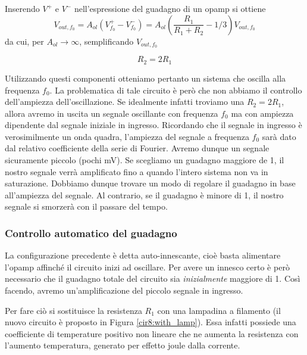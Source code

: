 Inserendo $V^+$ e $V^-$ nell'espressione del guadagno di un opamp si ottiene
\vspace{-2mm}
\begin{equation}
	V_{out,f_0} = A_{ol}\left( V^+_{f_0} - V^-_{f_0} \right) = A_{ol}\left(\frac{R_1}{R_1+R_2} - 1/3\right)V_{out,f_0}
\end{equation}
\vspace{-4mm}
da cui, per $A_{ol} \rightarrow \infty$, semplificando $V_{out,f_0}$

\begin{equation}
	R_2 = 2 R_1
\end{equation}

Utilizzando questi componenti otteniamo pertanto un sistema che oscilla alla frequenza $f_0$.
La problematica di tale circuito è però che non abbiamo il controllo dell'ampiezza dell'oscillazione. Se idealmente infatti troviamo una $R_2 = 2 R_1$, allora avremo in uscita un segnale oscillante con frequenza $f_0$ ma con ampiezza dipendente dal segnale iniziale in ingresso. Ricordando che il segnale in ingresso è verosimilmente un onda quadra, l'ampiezza del segnale a frequenza $f_0$ sarà dato dal relativo coefficiente della serie di Fourier. Avremo dunque un segnale sicuramente piccolo (pochi \si{\milli\volt}). Se scegliamo un guadagno maggiore de 1, il nostro segnale verrà amplificato fino a quando l'intero sistema non va in saturazione. Dobbiamo dunque trovare un modo di regolare il guadagno in base all'ampiezza del segnale. Al contrario, se il guadagno è minore di 1, il nostro segnale si smorzerà con il passare del tempo. 

\subsubsection*{Controllo automatico del guadagno}

La configurazione precedente è detta auto-innescante, cioè basta alimentare l'opamp affinché il circuito inizi ad oscillare.
Per avere un innesco certo è però necessario che il guadagno totale del circuito sia \textit{inizialmente} maggiore di \num{1}. Così facendo, avremo un'amplificazione del piccolo segnale in ingresso.

Per fare ciò si sostituisce la resistenza $R_1$ con una lampadina a filamento (il nuovo circuito è proposto in Figura \ref{cir8:with_lamp}).
Essa infatti possiede una coefficiente di temperature positivo non lineare che ne aumenta la resistenza con l'aumento temperatura, generato per effetto joule dalla corrente.

